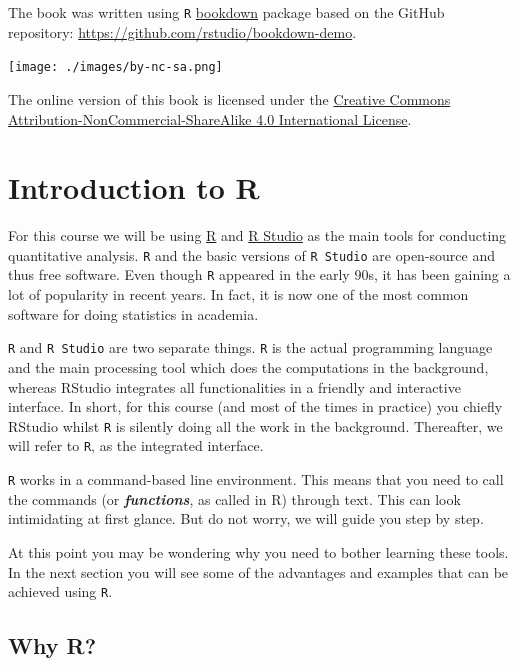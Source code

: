 \documentclass[
]{book}
\begin{document}
The book was written using \texttt{R} \href{https://github.com/rstudio/bookdown}{bookdown} package based on the GitHub repository: \url{https://github.com/rstudio/bookdown-demo}.

\texttt{[image: ./images/by-nc-sa.png]}

The online version of this book is licensed under the \href{http://creativecommons.org/licenses/by-nc-sa/4.0/}{Creative Commons Attribution-NonCommercial-ShareAlike 4.0 International License}.

\hypertarget{lab-intro}{%
\chapter{Introduction to R}\label{lab-intro}}

For this course we will be using \href{https://www.r-project.org/}{R} \citep{R-base} and \href{https://rstudio.com/}{R Studio} as the main tools for conducting quantitative analysis. \texttt{R} and the basic versions of \texttt{R\ Studio} are open-source and thus free software. Even though \texttt{R} appeared in the early 90s, it has been gaining a lot of popularity in recent years. In fact, it is now one of the most common software for doing statistics in academia.

\texttt{R} and \texttt{R\ Studio} are two separate things. \texttt{R} is the actual programming language and the main processing tool which does the computations in the background, whereas RStudio integrates all functionalities in a friendly and interactive interface. In short, for this course (and most of the times in practice) you chiefly RStudio whilst \texttt{R} is silently doing all the work in the background. Thereafter, we will refer to \texttt{R}, as the integrated interface.

\texttt{R} works in a command-based line environment. This means that you need to call the commands (or \emph{\textbf{functions}}, as called in R) through text. This can look intimidating at first glance. But do not worry, we will guide you step by step.

At this point you may be wondering why you need to bother learning these tools. In the next section you will see some of the advantages and examples that can be achieved using \texttt{R}.

\hypertarget{why-r}{%
\section{Why R?}\label{why-r}}
\end{document}
